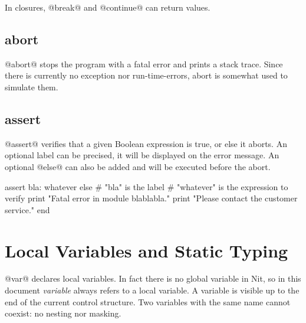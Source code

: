 In closures, @break@ and @continue@ can return values.

\subsection{abort}\label{abort}

@abort@ stops the program with a fatal error and prints a stack trace.
Since there is currently no exception nor run-time-errors, abort is somewhat used to simulate them.

\subsection{assert}\label{assert}

@assert@ verifies that a given Boolean expression is true, or else it aborts.
An optional label can be precised, it will be displayed on the error message.
An optional @else@ can also be added and will be executed before the abort.
\begin{lst}
assert bla: whatever else
	# "bla" is the label
	# "whatever" is the expression to verify
	print "Fatal error in module blablabla."
	print "Please contact the customer service."
end
\end{lst}

\section{Local Variables and Static Typing}\label{var}\label{static type}

@var@ declares local variables.
In fact there is no global variable in Nit, so in this document \textit{variable} always refers to a local variable.
A variable is visible up to the end of the current control structure.
Two variables with the same name cannot coexist: no nesting nor masking.

